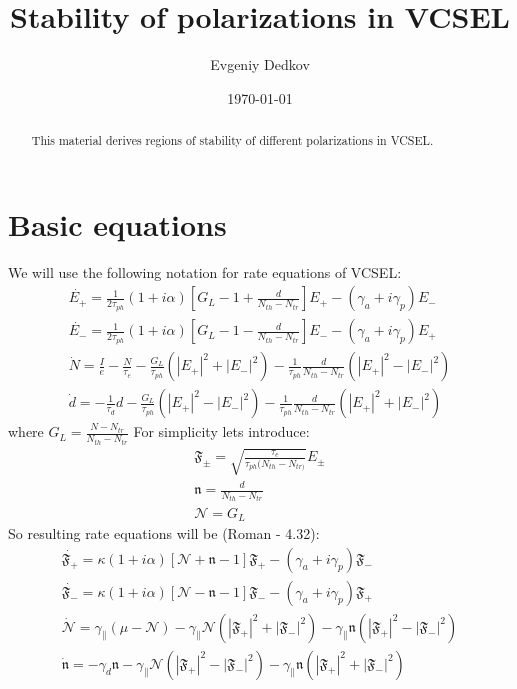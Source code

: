 \documentclass[12pt, notitlepage]{report}
\title{Stability of polarizations in VCSEL}
\author{Evgeniy Dedkov}
\date{\today}
\begin{document}
	
	\newcommand\scalemath[2]{\scalebox{#1}{\mbox{\ensuremath{\displaystyle #2}}}}
	\newcommand{\F}{\boldsymbol{\mathfrak{F}}}
	\newcommand{\n}{\boldsymbol{\mathfrak{n}}}
	\newcommand{\N}{\boldsymbol{\mathcal{N}}}
	\newcommand{\Q}{\mathcal{Q}}
	\newcommand{\gp}{\gamma_{\parallel}}
	
	\maketitle
	\thispagestyle{empty}
	
	\begin{abstract}
		This material derives regions of stability of different polarizations in VCSEL.
	\end{abstract}
	
	\section{Basic equations}
	We will use the following notation for rate equations of VCSEL:
	\begin{gather}
		\dot{E_+} = \frac{1}{2\tau_{ph}}(1+i\alpha)\left[G_L - 1+ \frac{d}{N_{th} - N_{tr}}\right] E_+ - (\gamma_a + i\gamma_p) E_- \\
		\dot{E_-} = \frac{1}{2\tau_{ph}}(1+i\alpha)\left[G_L - 1- \frac{d}{N_{th} - N_{tr}}\right] E_- - (\gamma_a + i\gamma_p) E_+ \\
		\dot{N} = \frac{I}{e} - \frac{N}{\tau_e} - \frac{G_L}{\tau_{ph}}(|E_+|^2+|E_-|^2) - \frac{1}{\tau_{ph}}\frac{d}{N_{th} - N_{tr}}(|E_+|^2 - |E_-|^2)\\
		\dot{d} = -\frac{1}{\tau_d} d -  \frac{G_L}{\tau_{ph}}(|E_+|^2-|E_-|^2) - \frac{1}{\tau_{ph}}\frac{d}{N_{th} - N_{tr}}(|E_+|^2+|E_-|^2)
	\end{gather}
	where $G_L = \frac{N - N_{tr}}{N_{th} - N_{tr}}$
	For simplicity lets introduce:
	\begin{gather}
		\F_\pm = \sqrt{\frac{\tau_{e}}{\tau_{ph}(N_{th} - N_{tr)}}}E_\pm \\
		\n = \frac{d}{N_{th} - N_{tr}} \\
		\N = G_L
	\end{gather}
	So resulting rate equations will be (Roman - 4.32):
	\begin{gather}
		\label{main_rate1}
		\dot{\F_+} = \kappa(1+i\alpha)\left[\N + \n - 1\right] \F_+ - (\gamma_a + i\gamma_p) \F_- \\
		\dot{\F_-} = \kappa(1+i\alpha)\left[\N - \n - 1\right] \F_- - (\gamma_a + i\gamma_p) \F_+ \\
		\dot{\N} = \gp\left(\mu-\N\right) - \gp\N(|\F_+|^2+|\F_-|^2) - \gp\n(|\F_+|^2 - |\F_-|^2) \\
		\label{main_rate4}
		\dot{\n} = -\gamma_d \n - \gp\N(|\F_+|^2-|\F_-|^2) - \gp\n(|\F_+|^2+|\F_-|^2)
	\end{gather}
	
\end{document}
